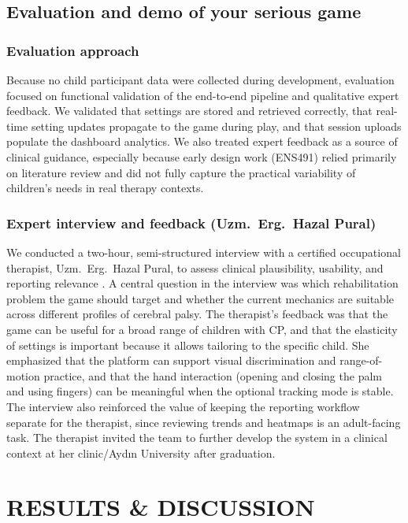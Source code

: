 \documentclass[12pt]{article}
\begin{document}
\subsection{Evaluation and demo of your serious game}
\subsubsection*{Evaluation approach}
Because no child participant data were collected during development, evaluation focused on functional validation of the end-to-end pipeline and qualitative expert feedback. We validated that settings are stored and retrieved correctly, that real-time setting updates propagate to the game during play, and that session uploads populate the dashboard analytics. We also treated expert feedback as a source of clinical guidance, especially because early design work (ENS491) relied primarily on literature review and did not fully capture the practical variability of children’s needs in real therapy contexts.

\subsubsection*{Expert interview and feedback (Uzm.\ Erg.\ Hazal Pural)}
We conducted a two-hour, semi-structured interview with a certified occupational therapist, Uzm.\ Erg.\ Hazal Pural, to assess clinical plausibility, usability, and reporting relevance \cite{ref18}. A central question in the interview was which rehabilitation problem the game should target and whether the current mechanics are suitable across different profiles of cerebral palsy. The therapist’s feedback was that the game can be useful for a broad range of children with CP, and that the elasticity of settings is important because it allows tailoring to the specific child. She emphasized that the platform can support visual discrimination and range-of-motion practice, and that the hand interaction (opening and closing the palm and using fingers) can be meaningful when the optional tracking mode is stable. The interview also reinforced the value of keeping the reporting workflow separate for the therapist, since reviewing trends and heatmaps is an adult-facing task. The therapist invited the team to further develop the system in a clinical context at her clinic/Ayd\i n University after graduation.

\clearpage
\section{RESULTS \& DISCUSSION}
\end{document}
